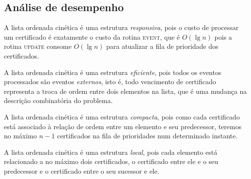 





\subsection{Análise de desempenho}\label{subsec:analise-de-desempenho}

A lista ordenada cinética é uma estrutura \textit{responsiva}, pois o custo de
processar um certificado é exatamente o custo da rotina \textsc{event}, que é $O(\lg{n})$ pois a
rotina \textsc{update} consome $O(\lg{n})$ para atualizar a fila de prioridade dos certificados.

A lista ordenada cinética é uma estrutura \textit{eficiente}, pois todos os eventos
processados são eventos \textit{externos}, isto é, todo vencimento de
certificado representa a troca de ordem entre dois elementos na lista, que é uma
mudança na descrição combinatória do problema.

A lista ordenada cinética é uma estrutura \textit{compacta}, pois como cada
certificado está associado à relação de ordem entre um elemento e seu
predecessor, teremos no máximo $n-1$ certificados na fila de prioridades num
determinado instante.

A lista ordenada cinética é uma estrutura \textit{local}, pois cada elemento
está relacionado a no máximo dois certificados, o certificado entre ele e o
seu predecessor e o certificado entre o seu sucessor e ele.
